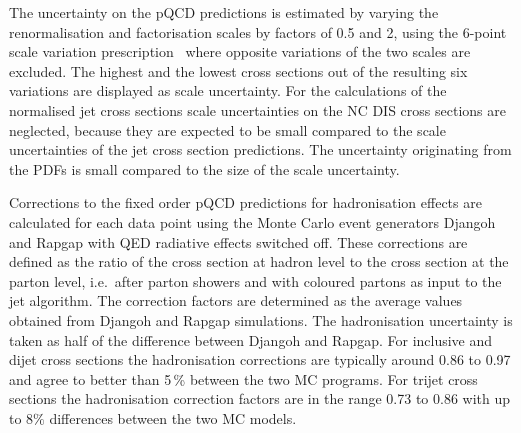 \documentclass[12pt]{article}
\begin{document}
    The uncertainty on the pQCD predictions is estimated by varying the renormalisation and factorisation
    scales by factors of 0.5 and 2, using the 6-point scale variation prescription~\cite{sixpoint1,sixpoint2}
    where opposite variations of the two scales are excluded.
    The highest and the lowest cross sections out of the resulting six variations are displayed as scale uncertainty.
    For the calculations of the normalised jet cross sections scale uncertainties on the NC DIS cross sections are neglected, 
    because they are expected to be small compared to the scale uncertainties of the jet cross section predictions.
    The uncertainty originating from the PDFs is small compared 
    to the size of the scale uncertainty.

Corrections to the fixed order pQCD predictions for hadronisation 
effects are calculated for each data point
using the Monte Carlo event generators Djangoh and Rapgap with 
QED radiative effects switched off.
These corrections are defined as the ratio of the 
cross section at hadron level to the cross 
section at the parton level, i.e.\ after parton showers and with coloured partons as input to the jet algorithm. 
The correction factors are determined
as the average values obtained from Djangoh and Rapgap simulations.
The hadronisation uncertainty is taken as 
half of the difference between Djangoh and Rapgap.
For inclusive and dijet cross sections the hadronisation 
corrections are typically around 0.86 to 0.97 and agree to better 
than 5\,\% between the two MC programs. 
For trijet cross sections the hadronisation correction factors are in the range 0.73 to 0.86
with up to $8\%$ differences between the two  MC models. 


\end{document}
